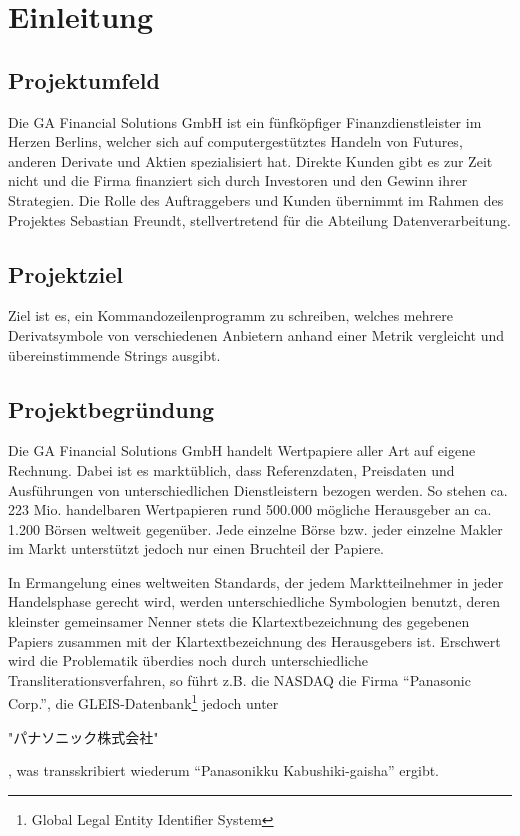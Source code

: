 \section{Einleitung}
\subsection{Projektumfeld}
Die GA Financial Solutions GmbH ist ein fünfköpfiger Finanzdienstleister im
Herzen Berlins, welcher sich auf computergestütztes Handeln
von Futures, anderen Derivate und Aktien spezialisiert hat. Direkte Kunden gibt es zur Zeit
nicht und die Firma finanziert sich durch Investoren und den Gewinn ihrer
Strategien. Die Rolle des Auftraggebers und Kunden übernimmt im Rahmen des
Projektes Sebastian Freundt, stellvertretend für die Abteilung Datenverarbeitung.\par

\subsection{Projektziel}
Ziel ist es, ein Kommandozeilenprogramm zu schreiben, welches mehrere Derivatsymbole 
von verschiedenen Anbietern anhand einer Metrik vergleicht und übereinstimmende 
Strings ausgibt.\par

\subsection{Projektbegründung}
Die GA Financial Solutions GmbH handelt Wertpapiere aller Art auf eigene
Rechnung.  Dabei ist es marktüblich, dass Referenzdaten, Preisdaten
und Ausführungen von unterschiedlichen Dienstleistern bezogen werden.
So stehen ca. 223 Mio. handelbaren Wertpapieren rund 500.000 mögliche
Herausgeber an ca. 1.200 Börsen weltweit gegenüber.  Jede einzelne
Börse bzw. jeder einzelne Makler im Markt unterstützt jedoch nur
einen Bruchteil der Papiere.\par

In Ermangelung eines weltweiten Standards, der jedem Marktteilnehmer in
jeder Handelsphase gerecht wird, werden unterschiedliche Symbologien
benutzt, deren kleinster gemeinsamer Nenner stets die
Klartextbezeichnung des gegebenen Papiers zusammen mit der
Klartextbezeichnung des Herausgebers ist.  Erschwert wird die
Problematik überdies noch durch unterschiedliche Transliterationsverfahren,
so führt z.B. die NASDAQ die Firma "`Panasonic Corp."',
die GLEIS-Datenbank\footnote{Global Legal Entity Identifier System} jedoch unter
\begin{CJK}{UTF8}{min}
"パナソニック株式会社"
\end{CJK}%
, was transskribiert wiederum "`Panasonikku Kabushiki-gaisha"' ergibt. \par

